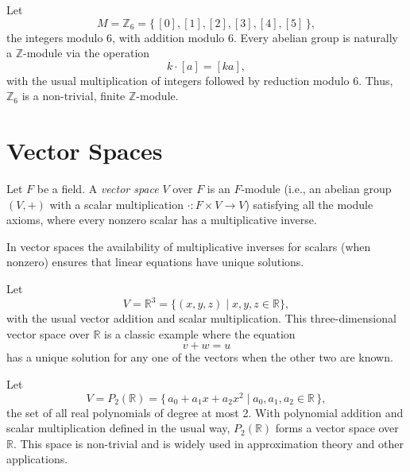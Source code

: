\documentclass[11pt,openany]{article}
\begin{document}
\begin{example}
	Let
	\[
	M=\mathbb{Z}_6 = \{\, [0], [1], [2], [3], [4], [5] \,\},
	\]
	the integers modulo 6, with addition modulo 6. Every abelian group is naturally a \(\mathbb{Z}\)-module via the operation
	\[
	k\cdot [a] = [ka],
	\]
	with the usual multiplication of integers followed by reduction modulo 6. Thus, \(\mathbb{Z}_6\) is a non-trivial, finite \(\mathbb{Z}\)-module.
\end{example}

\section{Vector Spaces}
\begin{definition}
	Let \(F\) be a field. A \emph{vector space} \(V\) over \(F\) is an \(F\)-module (i.e., an abelian group \((V, +)\) with a scalar multiplication \(\cdot: F\times V \to V\)) satisfying all the module axioms, where every nonzero scalar has a multiplicative inverse.
\end{definition}

In vector spaces the availability of multiplicative inverses for scalars (when nonzero) ensures that linear equations have unique solutions.

\begin{example}[\(\mathbb{R}^3\)]
	Let
	\[
	V = \mathbb{R}^3 = \{ (x,y,z) \mid x,y,z\in\mathbb{R} \},
	\]
	with the usual vector addition and scalar multiplication. This three-dimensional vector space over \(\mathbb{R}\) is a classic example where the equation
	\[
	v + w = u
	\]
	has a unique solution for any one of the vectors when the other two are known.
\end{example}

\begin{example}
	Let
	\[
	V = P_2(\mathbb{R}) = \{\, a_0 + a_1 x + a_2 x^2 \mid a_0,a_1,a_2 \in \mathbb{R} \,\},
	\]
	the set of all real polynomials of degree at most 2. With polynomial addition and scalar multiplication defined in the usual way, \(P_2(\mathbb{R})\) forms a vector space over \(\mathbb{R}\). This space is non-trivial and is widely used in approximation theory and other applications.
\end{example}
\end{document}
